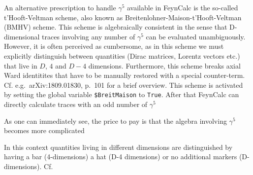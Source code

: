 \documentclass[../FeynCalcManual.tex]{subfiles}
\begin{document}
An alternative prescription to handle \(\gamma^5\) available in FeynCalc
is the so-called t'Hooft-Veltman scheme, also known as
Breitenlohner-Maison-t'Hooft-Veltman (BMHV) scheme. This scheme is
algebraically consistent in the sense that D-dimensional traces
involving any number of \(\gamma^5\) can be evaluated unambiguously.
However, it is often perceived as cumbersome, as in this scheme we must
explicitly distinguish between quantities (Dirac matrices, Lorentz
vectors etc.) that live in \(D\), \(4\) and \(D-4\) dimensions.
Furthermore, this scheme breaks axial Ward identitites that have to be
manually restored with a special counter-term. Cf.
e.g.~arXiv:1809.01830, p.~101 for a brief overview. This scheme is
activated by setting the global variable \texttt{\$BreitMaison} to
\texttt{True}. After that FeynCalc can directly calculate traces with an
odd number of \(\gamma^5\)

\begin{Shaded}
\begin{Highlighting}[]
\ExtensionTok{=}\NormalTok{;}
\OperatorTok{[}\OperatorTok{[}\OperatorTok{[}\OperatorTok{,}\OperatorTok{,}\OperatorTok{,}\OperatorTok{,}\OperatorTok{,}\OperatorTok{]}\OperatorTok{[}\OperatorTok{]]]}
\end{Highlighting}
\end{Shaded}

As one can immediately see, the price to pay is that the algebra
involving \(\gamma^5\) becomes more complicated

\begin{Shaded}
\begin{Highlighting}[]
\OperatorTok{[}\OperatorTok{[}\OperatorTok{]}\OperatorTok{[}\OperatorTok{]]}
\end{Highlighting}
\end{Shaded}

In this context quantities living in different dimensions are
distinguished by having a bar (4-dimensions) a hat (D-4 dimensions) or
no additional markers (D-dimensions). Cf.
\end{document}
